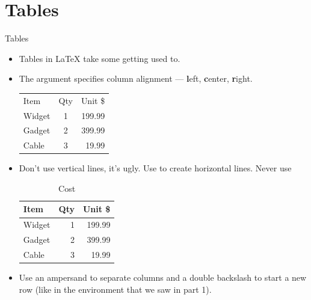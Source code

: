 \documentclass[10pt,times]{beamer}
\begin{document}
\section{Tables}
\begin{frame}[fragile]{Tables}
\begin{itemize}
\item Tables in \LaTeX{} take some getting used to.
\item The argument specifies column alignment --- \textbf{l}eft, 
\textbf{c}enter, \textbf{r}ight.
\begin{exampletwouptiny}
\begin{tabular}{lcr}
Item   & Qty & Unit \$ \\
Widget & 1   & 199.99  \\
Gadget & 2   & 399.99  \\
Cable  & 3   & 19.99   \\
\end{tabular}
\end{exampletwouptiny}
\item Don't use vertical lines, it's ugly. Use  to create 
horizontal lines. Never use 
\begin{exampletwouptiny}
\begin{table}[h]
\caption{Cost}
\begin{tabular}{lrr} \toprule
Item   & Qty & Unit \$ \\ \midrule
Widget & 1   & 199.99  \\
Gadget & 2   & 399.99  \\
Cable  & 3   & 19.99   \\ \bottomrule
\end{tabular}
\label{t:cost}
\end{table}
\end{exampletwouptiny}
\item Use an ampersand \keys{\&} to separate columns and a double 
backslash \keys{\bs}\keys{\bs} to start a new row (like in 
the  environment that we saw in part 1).
\end{itemize}
\end{frame}
\end{document}
